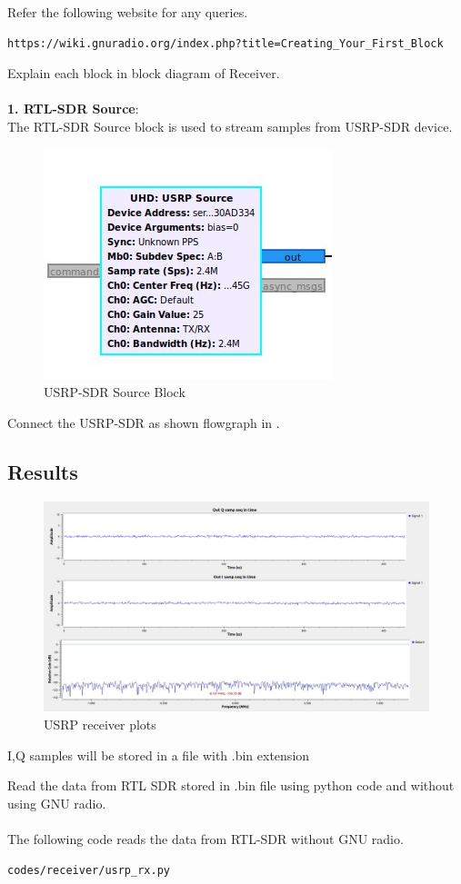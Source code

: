 Refer the following website for any queries.
\begin{lstlisting}
https://wiki.gnuradio.org/index.php?title=Creating_Your_First_Block
\end{lstlisting}
 Explain each block in block diagram of Receiver.\\
	\solution \\
\textbf{1. RTL-SDR Source}:\\
The RTL-SDR Source block is used to stream samples from USRP-SDR device.
\begin{figure}[H]
\centering
\includegraphics[width=0.4\columnwidth]{figs/usrp-sink.jpg}
\caption{USRP-SDR Source Block}
\label{fig:source block}
\end{figure}
Connect the USRP-SDR as shown flowgraph in .\\



\subsection{Results} 
\begin{figure}
\includegraphics[width=0.8\columnwidth]{figs/USRP_results.jpg}
\caption{USRP receiver plots}
\label{fig:plots}
\end{figure}

I,Q samples will be stored in a file with .bin extension

Read the data from RTL SDR stored in .bin file using python code and without using GNU radio.
\\
\solution \\
The following code reads the data from RTL-SDR without GNU radio.
\begin{lstlisting}
codes/receiver/usrp_rx.py
\end{lstlisting}
















